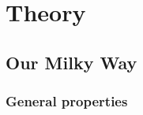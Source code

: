 \chapter{Theory}
\label{ch:theory}

%
%

\section{Our Milky Way}

\subsection{General properties}


